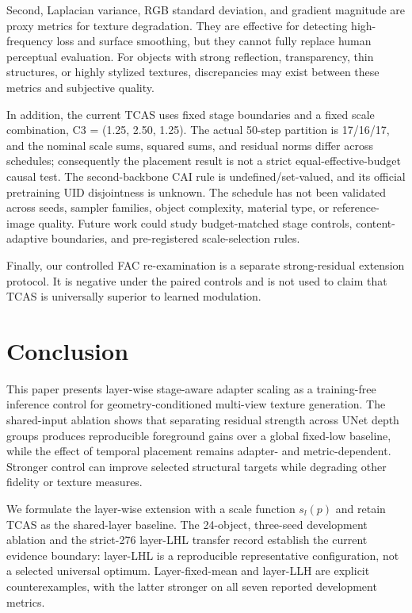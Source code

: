 \documentclass[times,twocolumn,final]{elsarticle}
\begin{document}
Second, Laplacian variance, RGB standard deviation, and gradient magnitude are proxy metrics for texture degradation. They are effective for detecting high-frequency loss and surface smoothing, but they cannot fully replace human perceptual evaluation. For objects with strong reflection, transparency, thin structures, or highly stylized textures, discrepancies may exist between these metrics and subjective quality.

In addition, the current TCAS uses fixed stage boundaries and a fixed scale combination, C3 = (1.25, 2.50, 1.25). The actual 50-step partition is 17/16/17, and the nominal scale sums, squared sums, and residual norms differ across schedules; consequently the placement result is not a strict equal-effective-budget causal test. The second-backbone CAI rule is undefined/set-valued, and its official pretraining UID disjointness is unknown. The schedule has not been validated across seeds, sampler families, object complexity, material type, or reference-image quality. Future work could study budget-matched stage controls, content-adaptive boundaries, and pre-registered scale-selection rules.

Finally, our controlled FAC re-examination is a separate strong-residual extension protocol. It is negative under the paired controls and is not used to claim that TCAS is universally superior to learned modulation.


\section{Conclusion}
\label{sec:conclusion}

This paper presents layer-wise stage-aware adapter scaling as a training-free inference control for geometry-conditioned multi-view texture generation. The shared-input ablation shows that separating residual strength across UNet depth groups produces reproducible foreground gains over a global fixed-low baseline, while the effect of temporal placement remains adapter- and metric-dependent. Stronger control can improve selected structural targets while degrading other fidelity or texture measures.

We formulate the layer-wise extension with a scale function $s_l(p)$ and retain TCAS as the shared-layer baseline. The 24-object, three-seed development ablation and the strict-276 layer-LHL transfer record establish the current evidence boundary: layer-LHL is a reproducible representative configuration, not a selected universal optimum. Layer-fixed-mean and layer-LLH are explicit counterexamples, with the latter stronger on all seven reported development metrics.
\end{document}
